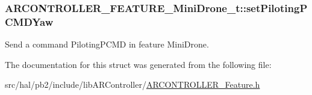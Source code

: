 \subsubsection[{\texorpdfstring{set\+Piloting\+P\+C\+M\+D\+Yaw}{setPilotingPCMDYaw}}]{ A\+R\+C\+O\+N\+T\+R\+O\+L\+L\+E\+R\+\_\+\+F\+E\+A\+T\+U\+R\+E\+\_\+\+Mini\+Drone\+\_\+t\+::set\+Piloting\+P\+C\+M\+D\+Yaw}\hypertarget{struct_a_r_c_o_n_t_r_o_l_l_e_r___f_e_a_t_u_r_e___mini_drone__t_a5fd51ddfa8b632777354c598d01e7bc0}{}\label{struct_a_r_c_o_n_t_r_o_l_l_e_r___f_e_a_t_u_r_e___mini_drone__t_a5fd51ddfa8b632777354c598d01e7bc0}
Send a command {\ttfamily Piloting\+P\+C\+MD} in feature {\ttfamily Mini\+Drone}. 

The documentation for this struct was generated from the following file\+:\begin{DoxyCompactItemize}
\item 
src/hal/pb2/include/lib\+A\+R\+Controller/\hyperlink{_a_r_c_o_n_t_r_o_l_l_e_r___feature_8h}{A\+R\+C\+O\+N\+T\+R\+O\+L\+L\+E\+R\+\_\+\+Feature.\+h}\end{DoxyCompactItemize}
